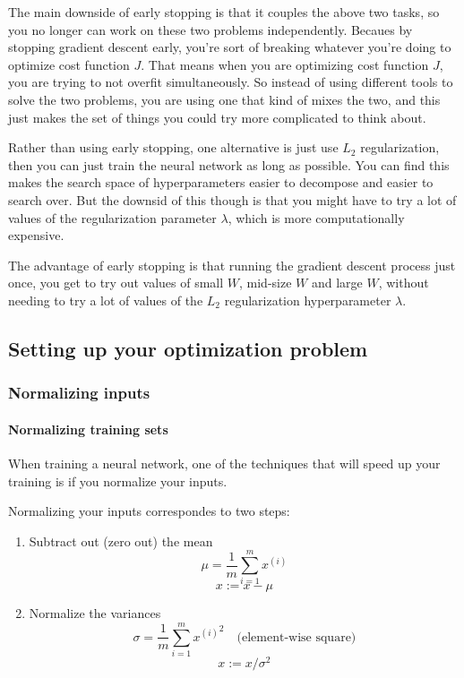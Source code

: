 \documentclass[UTF8]{article}
\newcommand{\Matrix}[1]{\boldsymbol{\mathit{#1}}}   %
\begin{document}
The main downside of early stopping is that it couples the above two tasks, so you no longer can
work on these two problems independently. Becaues by stopping gradient descent early, you're sort
of breaking whatever you're doing to optimize cost function $J$. That means when you are optimizing
cost function $J$, you are trying to not overfit simultaneously. So instead of using different
tools to solve the two problems, you are using one that kind of mixes the two, and this just makes
the set of things you could try more complicated to think about.

Rather than using early stopping, one alternative is just use $L_2$ regularization, then you can
just train the neural network as long as possible. You can find this makes the search space of
hyperparameters easier to decompose and easier to search over. But the downsid of this though is
that you might have to try a lot of values of the regularization parameter $\lambda$, which is more
computationally expensive.

The advantage of early stopping is that running the gradient descent process just once, you get to
try out values of small $\Matrix{W}$, mid-size $\Matrix{W}$ and large $\Matrix{W}$, without needing
to try a lot of values of the $L_2$ regularization hyperparameter $\lambda$.

\subsection{Setting up your optimization problem}
\subsubsection{Normalizing inputs}
\paragraph{Normalizing training sets}

When training a neural network, one of the techniques that will speed up your training is if you
normalize your inputs.

Normalizing your inputs correspondes to two steps:
\begin{enumerate}
    \item Subtract out (zero out) the mean
    $$ \mu = \frac{1}{m} \sum_{i=1}^m x^{(i)} $$
    $$ x := x - \mu $$
    \item Normalize the variances
    $$ \sigma = \frac{1}{m} \sum_{i=1}^m {x^{(i)}}^2 \quad \text{(element-wise square)}$$
    $$ x :=  x / \sigma^2 $$
\end{enumerate}
\end{document}
